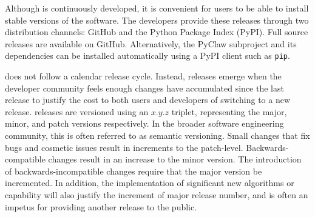 Although \clawpack is continuously developed, it is convenient for
users to be able to install stable versions of the software.  The
\clawpack developers provide these releases through two distribution
channels: GitHub and the Python Package Index (PyPI).  Full source
releases are available on GitHub.  Alternatively, the PyClaw
subproject and its dependencies can be installed automatically using a
PyPI client such as \texttt{pip}.

\clawpack does not follow a calendar release cycle.  Instead, releases
emerge when the developer community feels enough changes have
accumulated since the last release to justify the cost to both users
and developers of switching to a new release.  \clawpack releases are
versioned using an $x.y.z$ triplet, representing the major, minor, and
patch versions respectively.  In the broader software engineering
community, this is often referred to as semantic versioning.  Small
changes that fix bugs and cosmetic issues result in increments to the
patch-level.  Backwards-compatible changes result in an increase to
the minor version.  The introduction of backwards-incompatible changes
require that the major version be incremented.  In addition, the
implementation of significant new algorithms or capability will also
justify the increment of major release number, and is often an impetus
for providing another release to the public.

